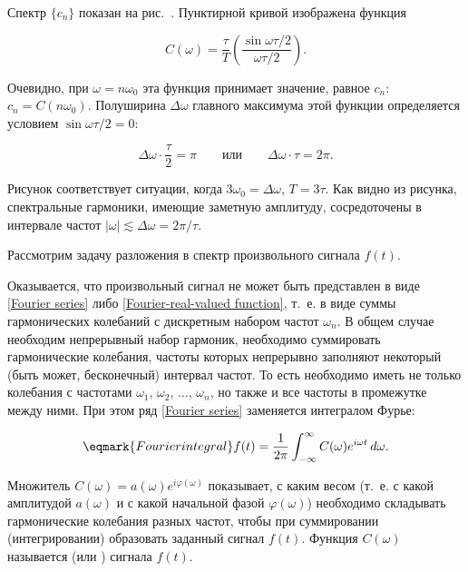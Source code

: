 Спектр $\{c_n\}$ показан на рис.~. Пунктирной кривой
изображена функция

\begin{equation*}
    C(\omega) =\frac{\tau}{T}\left(\frac{\sin\omega\tau/2}{\omega\tau/2}\right).
\end{equation*}

Очевидно, при $\omega=n\omega_0$ эта функция принимает значение, равное $c_n$:
$c_n=C(n\omega_0)$. Полуширина $\Delta
\omega$ главного максимума этой функции определяется условием
$\sin\omega\tau/2=0$:

\begin{equation*}
    \Delta\omega \cdot \frac{\tau}{2}=\pi\qquad \text{или} \qquad \Delta \omega
\cdot \tau =2\pi.
\end{equation*}

Рисунок соответствует ситуации, когда $3\omega_0=\Delta\omega$, $T=3\tau$. Как
видно из рисунка, спектральные гармоники,
имеющие заметную амплитуду, сосредоточены в интервале частот $|\omega|\lesssim
\Delta\omega=2\pi/\tau$.


Рассмотрим задачу разложения в спектр произвольного сигнала $f(t)$.

Оказывается, что произвольный сигнал не может быть представлен в виде
\eqref{Fourier series} либо \eqref{Fourier-real-valued function}, т.~е. в виде
суммы
гармонических колебаний с дискретным набором частот $\omega_n$. В общем случае
необходим непрерывный набор гармоник,
необходимо суммировать гармонические колебания, частоты которых непрерывно
заполняют некоторый (быть может, бесконечный)
интервал частот. То есть необходимо иметь не только колебания с частотами
$\omega_1$, $\omega_2$, $\dots$, $\omega_n$,
но также и все частоты в промежутке между ними. При этом ряд \eqref{Fourier
series} заменяется интегралом Фурье:

\begin{equation}
    \eqmark{Fourier integral}
    f(t)=\frac{1}{2\pi}\int_{-\infty}^\infty C(\omega)e^{i\omega t}\,d\omega.
\end{equation}

Множитель $C(\omega)=a(\omega)e^{i\varphi(\omega)}$ показывает, с каким весом
(т.~е. с какой амплитудой $a(\omega)$ и с
какой начальной фазой $\varphi(\omega)$) необходимо складывать гармонические
колебания разных частот, чтобы при суммировании
(интегрировании) образовать заданный сигнал $f(t)$. Функция $C(\omega)$
называется  (или
) сигнала $f(t)$.

